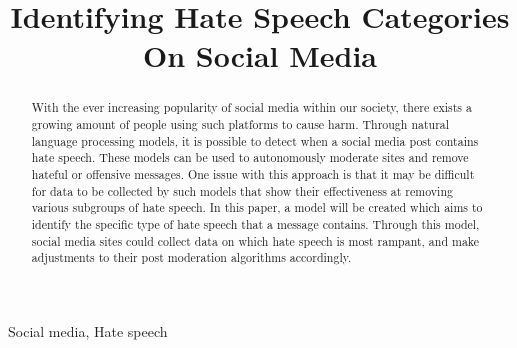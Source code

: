 \documentclass[conference]{IEEEtran}
\begin{document}
\title{Identifying Hate Speech Categories On Social Media\\
}

\author{
}

\maketitle

\begin{abstract}
With the ever increasing popularity of social media within our society, there exists a growing amount of people using such platforms to cause harm. Through natural language processing models, it is possible to detect when a social media post contains hate speech. These models can be used to autonomously moderate sites and remove hateful or offensive messages. One issue with this approach is that it may be difficult for data to be collected by such models that show their effectiveness at removing various subgroups of hate speech. In this paper, a model will be created which aims to identify the specific type of hate speech that a message contains. Through this model, social media sites could collect data on which hate speech is most rampant, and make adjustments to their post moderation algorithms accordingly.
\end{abstract}

\begin{IEEEkeywords}
Social media, Hate speech
\end{IEEEkeywords}
\end{document}
